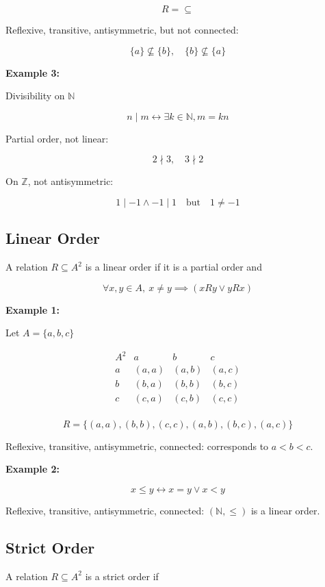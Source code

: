 \documentclass[12pt,a4paper,openany]{article}
\begin{document}
$$
R = \subseteq
$$

Reflexive, transitive, antisymmetric, but not connected:

$$
\{a\} \nsubseteq \{b\}, \quad \{b\} \nsubseteq \{a\}
$$

\textbf{Example 3:}

Divisibility on $\mathbb{N}$

$$
n \mid m \leftrightarrow \exists k \in \mathbb{N}, m = kn
$$

Partial order, not linear:

$$
2 \nmid 3, \quad 3 \nmid 2
$$

On $\mathbb{Z}$, not antisymmetric:

$$
1 \mid -1 \land -1 \mid 1 \quad \text{but} \quad 1 \neq -1
$$

\subsection{Linear Order}

A relation $R \subseteq A^2$ is a linear order if it is a partial order and

$$
\forall x,y \in A, \ x \neq y \implies (xRy \lor yRx)
$$

\textbf{Example 1:}

Let $A = \{a,b,c\}$

$$
\begin{array}{c|ccc}
A^2 & a & b & c \\
\hline
a & (a,a) & (a,b) & (a,c) \\
b & (b,a) & (b,b) & (b,c) \\
c & (c,a) & (c,b) & (c,c) \\
\end{array}
$$

$$
R = \{(a,a),(b,b),(c,c),(a,b),(b,c),(a,c)\}
$$

Reflexive, transitive, antisymmetric, connected: corresponds to $a < b < c$.

\textbf{Example 2:}

$$ x \leq y \leftrightarrow x = y \vee x < y $$

Reflexive, transitive, antisymmetric, connected: $(\mathbb{N}, \leq)$ is a linear order.

\subsection{Strict Order}

A relation $R \subseteq A^2$ is a strict order if
\end{document}
